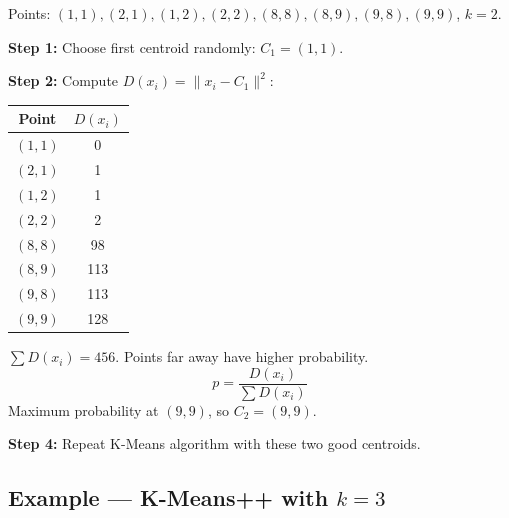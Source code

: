 \documentclass[12pt,a4paper]{article}
\begin{document}
\begin{examplebox}
Points: $(1,1),(2,1),(1,2),(2,2),(8,8),(8,9),(9,8),(9,9)$, $k=2$.

\textbf{Step 1:} Choose first centroid randomly: $C_1 = (1,1)$.

\textbf{Step 2:} Compute $D(x_i) = \|x_i - C_1\|^2$:
\begin{center}
\begin{tabular}{cc}
\toprule
Point & $D(x_i)$ \\
\midrule
$(1,1)$ & 0 \\
$(2,1)$ & 1 \\
$(1,2)$ & 1 \\
$(2,2)$ & 2 \\
$(8,8)$ & 98 \\
$(8,9)$ & 113 \\
$(9,8)$ & 113 \\
$(9,9)$ & 128 \\
\bottomrule
\end{tabular}
\end{center}

$\sum D(x_i) = 456$. Points far away have higher probability.
\[
p = \frac{D(x_i)}{\sum D(x_i)}
\]
Maximum probability at $(9,9)$, so $C_2 = (9,9)$.

\textbf{Step 4:} Repeat K-Means algorithm with these two good centroids.
\end{examplebox}

\subsection{Example --- K-Means++ with $k=3$}
\end{document}
